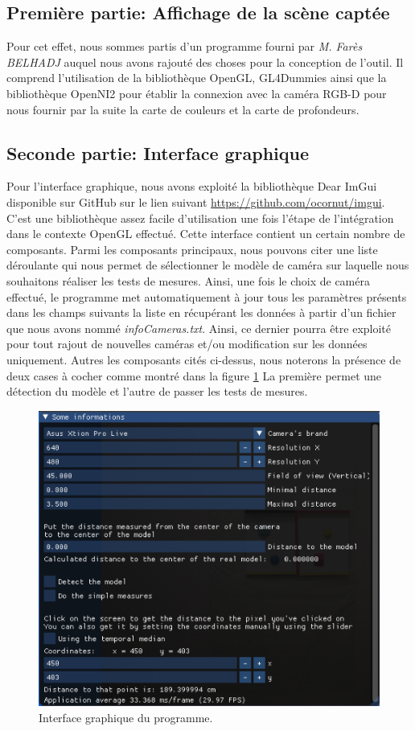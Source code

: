 \documentclass[a4paper, 12pt]{book}
\newcounter{program}[subsection]
\begin{document}
\subsection{Première partie: Affichage de la scène captée }
Pour cet effet, nous sommes partis d'un programme fourni par \emph{M. Farès BELHADJ} auquel nous avons rajouté des choses pour la conception de l'outil. Il comprend l'utilisation de la bibliothèque OpenGL, GL4Dummies ainsi que la bibliothèque OpenNI2 pour établir la connexion avec la caméra RGB-D pour nous fournir par la suite la carte de couleurs et la carte de profondeurs.
\subsection{Seconde partie: Interface graphique}
Pour l'interface graphique, nous avons exploité la bibliothèque Dear ImGui disponible sur GitHub sur le lien suivant \url{https://github.com/ocornut/imgui}. C'est une bibliothèque assez facile d'utilisation une fois l'étape de l'intégration dans le contexte OpenGL effectué. Cette interface contient un certain nombre de composants. Parmi les composants principaux, nous pouvons citer une liste déroulante qui nous permet de sélectionner le modèle de caméra sur laquelle nous souhaitons réaliser les tests de mesures. Ainsi, une fois le choix de caméra effectué, le programme met automatiquement à jour tous les paramètres présents dans les champs suivants la liste en récupérant les données à partir d'un fichier que nous avons nommé \emph{infoCameras.txt}. Ainsi, ce dernier pourra être exploité pour tout rajout de nouvelles caméras et/ou modification sur les données uniquement.
Autres les composants cités ci-dessus, nous noterons la présence de deux cases à cocher comme montré dans la figure \ref{fig-gui} La première permet une détection du modèle et l'autre de passer les tests de mesures.
\begin{figure}[htbp]
  \hspace{3.5cm}
 \includegraphics[scale=0.5]{images/GUI.png} \hspace{2cm}
  \caption{Interface graphique du programme.\label{fig-gui}}
\end{figure}
\end{document}
